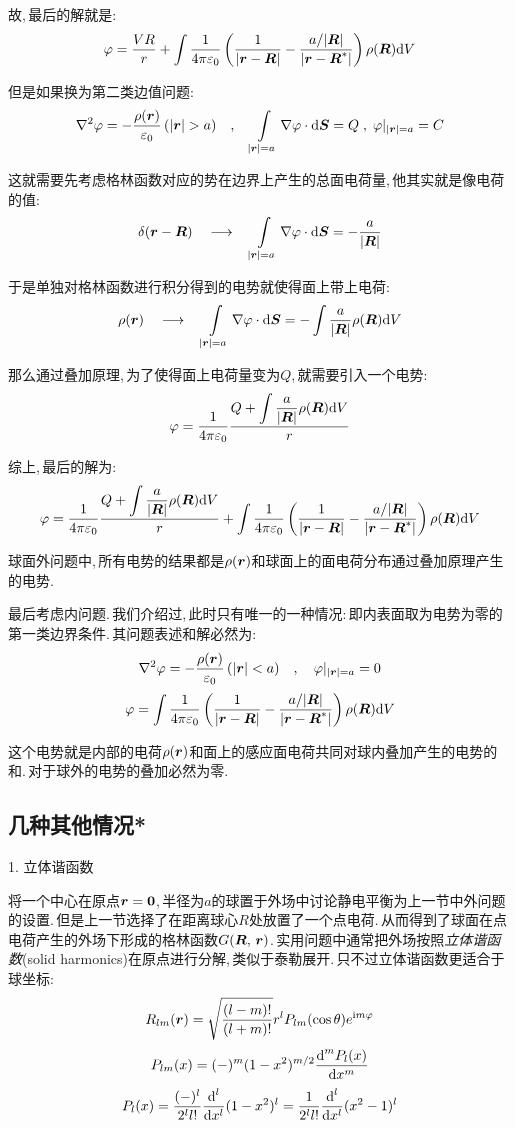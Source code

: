 故,\,最后的解就是:
\[\varphi=\frac{VR}{r}+\int \frac{1}{4\pi\varepsilon_0} \left(\frac{1}{|\boldsymbol{r}-\boldsymbol{R}|}-\frac{a/|\boldsymbol{R}|}{|\boldsymbol{r}-\boldsymbol{R}^\ast|}\right)\rho(\boldsymbol{R})\textrm{d} V\]

但是如果换为第二类边值问题:
\[\nabla^2\varphi = -\frac{\rho(\bs{r})}{\varepsilon_0}\,(|\bs{r}|>a)\quad ,\quad \int\limits_{|\bs{r}|=a}\nabla\varphi\cdot \ud \bs{S}=Q\;,\;\varphi|_{|\bs{r}|=a}=C\]

这就需要先考虑格林函数对应的势在边界上产生的总面电荷量,\,他其实就是像电荷的值:
\[\delta(\boldsymbol{r}-\boldsymbol{R})\quad \longrightarrow\quad  \int\limits_{|\boldsymbol{r}|=a}\nabla\varphi\cdot \textrm{d} \boldsymbol{S}=-\frac{a}{|\boldsymbol{R}|}\]

于是单独对格林函数进行积分得到的电势就使得面上带上电荷:
\[\rho(\boldsymbol{r})\quad \longrightarrow\quad \int\limits_{|\boldsymbol{r}|=a}\nabla\varphi\cdot \textrm{d} \boldsymbol{S}=-\int \frac{a}{|\boldsymbol{R}|}\rho(\boldsymbol{R})\textrm{d} V\]

那么通过叠加原理,\,为了使得面上电荷量变为$Q$,\,就需要引入一个电势:
\[\varphi=\frac{1}{4\pi\varepsilon_0} \frac{Q+\displaystyle\int \frac{a}{|\boldsymbol{R}|}\rho(\boldsymbol{R})\textrm{d} V}{r}\]

综上,\,最后的解为:
\[\varphi =\frac{1}{4\pi\varepsilon_0} \frac{Q+\displaystyle\int \frac{a}{|\boldsymbol{R}|}\rho(\boldsymbol{R})\textrm{d} V}{r}+\int \frac{1}{4\pi\varepsilon_0} \left(\frac{1}{|\boldsymbol{r}-\boldsymbol{R}|}-\frac{a/|\boldsymbol{R}|}{|\boldsymbol{r}-\boldsymbol{R}^\ast|}\right)\rho(\boldsymbol{R})\textrm{d} V \]

球面外问题中,\,所有电势的结果都是$\rho(\boldsymbol{r})$和球面上的面电荷分布通过叠加原理产生的电势.

最后考虑内问题.\,我们介绍过,\,此时只有唯一的一种情况:\,即内表面取为电势为零的第一类边界条件.\,其问题表述和解必然为:
\[\nabla^2\varphi = -\frac{\rho(\boldsymbol{r})}{\varepsilon_0}\,(|\boldsymbol{r}|<a)\quad ,\quad \varphi|_{|\boldsymbol{r}|=a}=0\]
\[\varphi=\int \frac{1}{4\pi\varepsilon_0} \left(\frac{1}{|\boldsymbol{r}-\boldsymbol{R}|}-\frac{a/|\boldsymbol{R}|}{|\boldsymbol{r}-\boldsymbol{R}^\ast|}\right)\rho(\boldsymbol{R})\textrm{d} V\]

这个电势就是内部的电荷$\rho(\boldsymbol{r})$和面上的感应面电荷共同对球内叠加产生的电势的和.\,对于球外的电势的叠加必然为零.

\subsection{几种其他情况*}

\vspace{0.2cm}
1. 立体谐函数
\vspace{0.2cm}

将一个中心在原点$\boldsymbol{r}=\boldsymbol{0}$,\,半径为$a$的球置于外场中讨论静电平衡为上一节中外问题的设置.\,但是上一节选择了在距离球心$R$处放置了一个点电荷.\,从而得到了球面在点电荷产生的外场下形成的格林函数$G(\boldsymbol{R},\,\boldsymbol{r})$.\,实用问题中通常把外场按照\emph{立体谐函数}(solid harmonics)在原点进行分解,\,类似于泰勒展开.\,只不过立体谐函数更适合于球坐标:
\[R_{lm}(\boldsymbol{r})=\sqrt{\frac{(l-m)!}{(l+m)!}}r^lP_{lm}(\cos\theta)e^{{\rm i} m\varphi}\]
\[P_{lm}(x)=(-)^m(1-x^2)^{m/2}\frac{\textrm{d}^mP_l(x)}{\textrm{d} x^m}\]
\[P_l(x)=\frac{(-)^l}{2^ll!}\frac{\textrm{d}^l}{\textrm{d} x^l}(1-x^2)^l=\frac{1}{2^ll!}\frac{\textrm{d}^l}{\textrm{d} x^l}(x^2-1)^l\]

